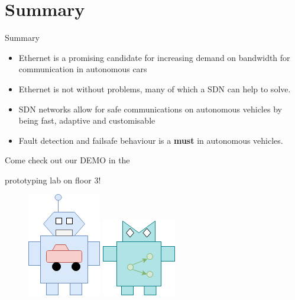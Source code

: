 \documentclass{beamer}
\begin{document}
\section{Summary}
\begin{frame}{Summary}
    \begin{itemize}
        \item Ethernet is a promising candidate for increasing demand on bandwidth for communication in autonomous cars
        \item Ethernet is not without problems, many of which a SDN can help to solve.
        \item SDN networks allow for safe communications on autonomous vehicles by being fast, adaptive and customisable
        \item Fault detection and failsafe behaviour is a \textbf{must} in autonomous vehicles.
    \end{itemize}

\end{frame}


\begin{frame}
    \Huge{\centerline{Come check out our DEMO in the}} 
    \Huge{\centerline{prototyping lab on floor 3!}} 
    \begin{figure}
        \includegraphics[width=0.2\linewidth]{robocar.png}
        \includegraphics[width=0.2\linewidth]{robonet.png}
    \end{figure}
\end{frame}



        
\end{document}
